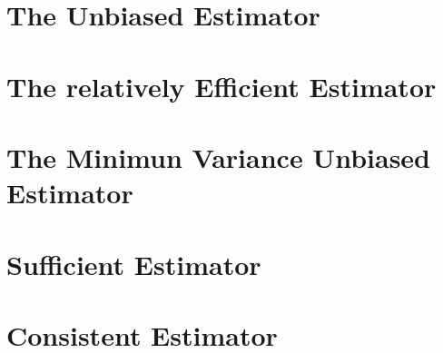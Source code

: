 \section{The Unbiased Estimator}

\section{The relatively Efficient Estimator}

\section{The Minimun Variance Unbiased Estimator}

\section{Sufficient Estimator}

\section{Consistent Estimator}

